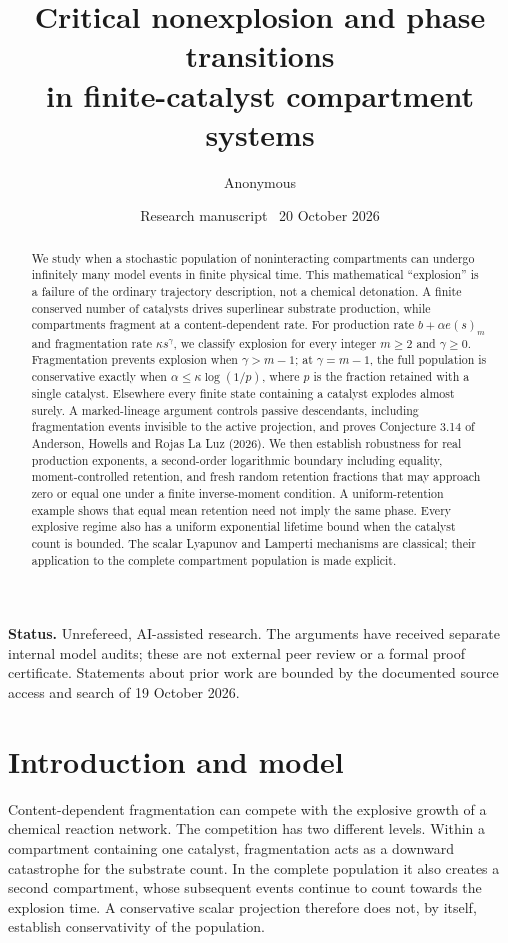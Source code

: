 \documentclass[11pt,a4paper]{article}
\title{Critical nonexplosion and phase transitions\protect\\in finite-catalyst compartment systems}
\author{Anonymous}
\date{Research manuscript \textbullet\ 20 October 2026}
\theoremstyle{remark}\newtheorem{remark}[theorem]{Remark}
\begin{document}
\maketitle
\vspace{-1.5em}
\begin{abstract}
We study when a stochastic population of noninteracting compartments can undergo infinitely many model events in finite physical time. This mathematical ``explosion'' is a failure of the ordinary trajectory description, not a chemical detonation. A finite conserved number of catalysts drives superlinear substrate production, while compartments fragment at a content-dependent rate. For production rate $b+\alpha e(s)_m$ and fragmentation rate $\kappa s^\gamma$, we classify explosion for every integer $m\ge2$ and $\gamma\ge0$. Fragmentation prevents explosion when $\gamma>m-1$; at $\gamma=m-1$, the full population is conservative exactly when $\alpha\le\kappa\log(1/p)$, where $p$ is the fraction retained with a single catalyst. Elsewhere every finite state containing a catalyst explodes almost surely. A marked-lineage argument controls passive descendants, including fragmentation events invisible to the active projection, and proves Conjecture 3.14 of Anderson, Howells and Rojas La Luz (2026). We then establish robustness for real production exponents, a second-order logarithmic boundary including equality, moment-controlled retention, and fresh random retention fractions that may approach zero or equal one under a finite inverse-moment condition. A uniform-retention example shows that equal mean retention need not imply the same phase. Every explosive regime also has a uniform exponential lifetime bound when the catalyst count is bounded. The scalar Lyapunov and Lamperti mechanisms are classical; their application to the complete compartment population is made explicit.
\end{abstract}
\noindent\textbf{Status.} Unrefereed, AI-assisted research. The arguments have received separate internal model audits; these are not external peer review or a formal proof certificate. Statements about prior work are bounded by the documented source access and search of 19 October 2026.

\section{Introduction and model}

Content-dependent fragmentation can compete with the explosive growth of a chemical reaction network. The competition has two different levels. Within a compartment containing one catalyst, fragmentation acts as a downward catastrophe for the substrate count. In the complete population it also creates a second compartment, whose subsequent events continue to count towards the explosion time. A conservative scalar projection therefore does not, by itself, establish conservativity of the population.
\end{document}
